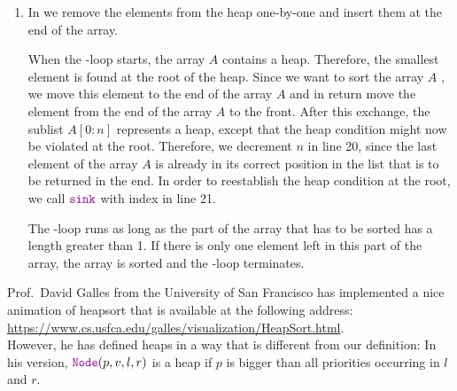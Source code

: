 \begin{enumerate}
\begin{enumerate}
            In order to maintain the invariant for index ${k}$, $\mytt{sink}$ is called with
            argument ${k}$,  since at this point, the tree rooted at index ${k}$ satisfies
            the heap condition except possibly at its root.  It is then the job of $\mytt{sink}$ to
            establish the heap condition at index ${k}$.  If the element at the root has a
            priority that is too low, $\mytt{sink}$ ensures that this element sinks down in the tree
            as far as necessary.

            This phase is also called the   of the array.
      \item In  we remove the elements from the heap one-by-one and insert them at the end of
            the array.

            When the -loop starts, the array ${A}$ contains a heap.  Therefore,
            the smallest element is found at the root of the heap.  Since we want to sort the
            array ${A}$ , we move this element to the end of the array ${A}$ and in
            return move the element from the end of the array ${A}$ to the front.
            After this exchange, the sublist $A[0:n]$ represents a heap, except that the
            heap condition might now be violated at the root.  Therefore, we decrement ${n}$ in line 20, since the
            last element of the array ${A}$ is already in its correct position in the list that is to be
            returned in the end.  In order to reestablish the heap condition at the root, we call $\mytt{sink}$ with index
             in line 21.

            The -loop runs as long as the part of the array that has to be sorted has
            a length greater than 1.  If there is only one element left in this part of the array, the array is
            sorted and the -loop terminates.
      \end{enumerate}
\end{enumerate}
Prof.~David Galles from the University of San Francisco has implemented a nice animation of heapsort that is
available at the following address:
\\[0.2cm]
\hspace*{1.3cm}
\href{https://www.cs.usfca.edu/~galles/visualization/HeapSort.html}{https://www.cs.usfca.edu/galles/visualization/HeapSort.html}.
\\[0.2cm] 
However, he has defined heaps in a way that is different from our definition:  In his version,
$\mytt{Node}(p, v, l, r)$ is a heap if $p$ is bigger than all priorities occurring in $l$ and $r$.

